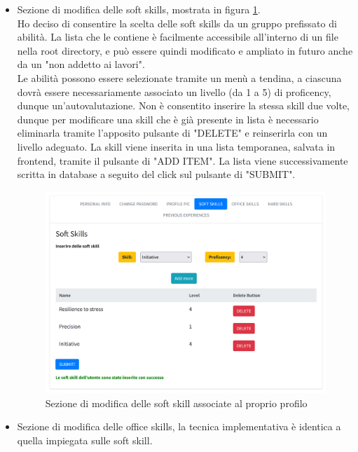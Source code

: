 \begin{itemize}
    \item Sezione di modifica delle soft skills, mostrata in figura \ref{fig:modificaInformazioni}.
    \\
    Ho deciso di consentire la scelta delle soft skills da un gruppo prefissato di abilità. La lista che le contiene è facilmente accessibile all'interno di un file nella root directory, e può essere quindi modificato e ampliato in futuro anche da un "non addetto ai lavori".
    \\
    Le abilità possono essere selezionate tramite un menù a tendina, a ciascuna dovrà essere necessariamente associato un livello (da 1 a 5) di proficency, dunque un'autovalutazione. Non è consentito inserire la stessa skill due volte, dunque per modificare una skill che è già presente in lista è necessario eliminarla tramite l'apposito pulsante di "DELETE" e reinserirla con un livello adeguato. La skill viene inserita in una lista temporanea, salvata in frontend, tramite il pulsante di "ADD ITEM". La lista viene successivamente scritta in database a seguito del click sul pulsante di "SUBMIT".
    \begin{figure}[h]
        \centering
        \includegraphics[width=450px]{./images/soft_skills.png}
        \caption{Sezione di modifica delle soft skill associate al proprio profilo}
        \label{fig:modificaInformazioni}
    \end{figure}
    
    \item Sezione di modifica delle office skills, la tecnica implementativa è identica a quella impiegata sulle soft skill.
    

\end{itemize}
